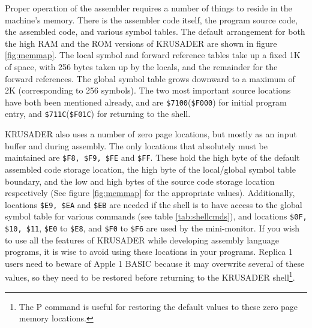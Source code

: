 \documentclass[12pt]{article}
\newcommand{\replica}[1]{\textsf{#1}}
\newcommand{\krusader}{\textsf{KRUSADER}\xspace}
\begin{document}
Proper operation of the assembler requires a number of things to reside in the machine's memory.
There is the assembler code itself, the program source code, the assembled code, and various
symbol tables.  The default arrangement for both the high RAM and the ROM versions of \krusader
are shown in figure \ref{fig:memmap}.  The local symbol and forward reference tables take up a
fixed 1K of space, with 256 bytes taken up by the locals, and the remainder for the forward references.
The global symbol table grows downward to a maximum of 2K (corresponding to 256 symbols).  
The two most important source locations have both been mentioned already, and are \texttt{\$7100}(\texttt{\$F000}) 
for initial program entry, and \texttt{\$711C}(\texttt{\$F01C}) for returning to the shell.

\krusader also
uses a number of zero page locations, but mostly as an input buffer and during assembly.  The only
locations that absolutely must be maintained are \texttt{\$F8, \$F9, \$FE} and \texttt{\$FF}.  These hold
the high byte of the default assembled code storage location, the high byte of the local/global
symbol table boundary, and the low and high bytes of the source code storage location respectively
(See figure \ref{fig:memmap} for the appropriate values).
Additionally, locations \texttt{\$E9, \$EA} and \texttt{\$EB} are needed if the shell is to have access to the global symbol
table for various commands (see table \ref{tab:shellcmds}), and locations \texttt{\$0F, \$10, \$11}, \texttt{\$E0} to \texttt{\$E8},
and \texttt{\$F0} to \texttt{\$F6} are used by the mini-monitor. If you wish to use all the features of
\krusader while developing assembly language programs, it is wise to avoid using these locations in your programs.
Replica 1 users need to beware of Apple 1 BASIC because it may overwrite several of these values, so they need to 
be restored before returning to the \krusader shell\footnote{The \replica{P} command is useful 
for restoring the default values to these zero page memory locations.}.  
\end{document}
